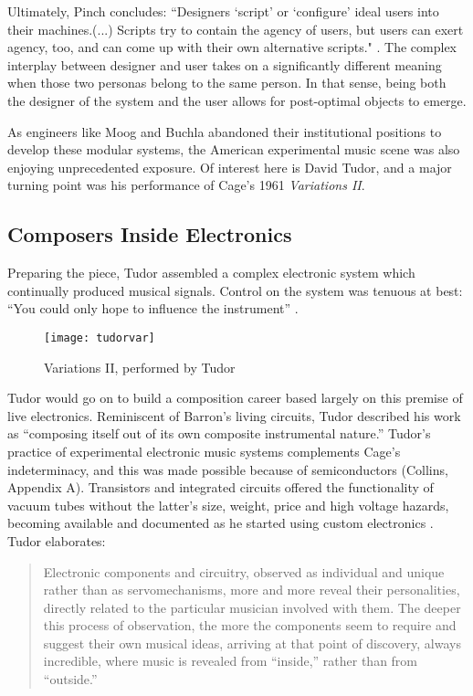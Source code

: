 Ultimately, Pinch concludes: ``Designers `script' or `configure' ideal users into their machines.(...) Scripts try to contain the agency of users, but users can exert agency, too, and can come up with their own alternative scripts." \cite[p.311]{pinch2002}. The complex interplay between designer and user takes on a significantly different meaning when those two personas belong to the same person. In that sense, being both the designer of the system and the user allows for post-optimal objects to emerge.
	
As engineers like Moog and Buchla abandoned their institutional positions to develop these modular systems, the American experimental music scene was also enjoying unprecedented exposure. Of interest here is David Tudor, and a major turning point was his performance of Cage's 1961 \textit{Variations II}. 

\subsection{Composers Inside Electronics}

Preparing the piece, Tudor assembled a complex electronic system which continually produced musical signals. Control on the system was tenuous at best: “You could only hope to influence the instrument” \citep{nakai2014}. 
	 
 	\begin{figure}[H]
 	  \centering
 	    \texttt{[image: tudorvar]}
 	    \caption{Variations II, performed by Tudor}
 	\end{figure}
	
Tudor would go on to build a composition career based largely on this premise of live electronics. Reminiscent of Barron’s living circuits, Tudor described his work as “composing itself out of its own composite instrumental nature.”\citep{tudor,kuivila2004} Tudor's practice of experimental electronic music systems complements Cage’s indeterminacy, and this was made possible because of semiconductors (Collins, Appendix A). Transistors and integrated circuits offered the functionality of vacuum tubes without the latter’s size, weight, price and high voltage hazards, becoming available and documented as he started using custom electronics \citep{collins2004}. Tudor elaborates: 

\begin{quote}
						
Electronic components and circuitry, observed as individual and unique rather than as servomechanisms, more and more reveal their personalities, directly related to the particular musician involved with them. The deeper this process of observation, the more the components seem to require and suggest their own musical ideas, arriving at that point of discovery, always incredible, where music is revealed from ``inside,'' rather than from ``outside.'' 

\end{quote}

